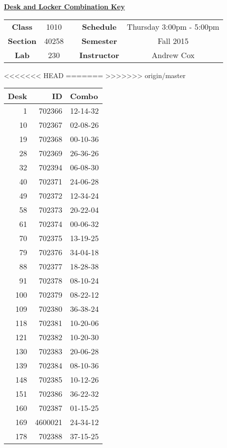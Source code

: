 \documentclass[12pt]{article}
\begin{document}
\thispagestyle{empty}

\begin{center}
	{\huge\textbf{\underline{ Desk and Locker Combination Key}}}
\end{center}


\begin{table}[h]
  \centering
  \begin{tabular}{ccccc}

  \textbf{Class} & 1010 & {\qquad} &\textbf{Schedule} & Thursday 3:00pm - 5:00pm \\
  \textbf{Section} & 40258 & {\qquad} & \textbf{Semester} & Fall 2015 \\
  \textbf{Lab} & 230 & {\qquad} & \textbf{Instructor} & Andrew Cox \\
  \end{tabular}
\end{table}
<<<<<<< HEAD
 \vspace{0.1in}
=======
 \vspace{0.5in}
>>>>>>> origin/master
\begin{minipage}{0.4\textwidth}

\begin{tabular}{rrl}
\toprule
 Desk &       ID &     Combo \\
\midrule
    1 &   702366 &  12-14-32 \\
   10 &   702367 &  02-08-26 \\
   19 &   702368 &  00-10-36 \\
   28 &   702369 &  26-36-26 \\
   32 &   702394 &  06-08-30 \\
   40 &   702371 &  24-06-28 \\
   49 &   702372 &  12-34-24 \\
   58 &   702373 &  20-22-04 \\
   61 &   702374 &  00-06-32 \\
   70 &   702375 &  13-19-25 \\
   79 &   702376 &  34-04-18 \\
   88 &   702377 &  18-28-38 \\
   91 &   702378 &  08-10-24 \\
  100 &   702379 &  08-22-12 \\
  109 &   702380 &  36-38-24 \\
  118 &   702381 &  10-20-06 \\
  121 &   702382 &  10-20-30 \\
  130 &   702383 &  20-06-28 \\
  139 &   702384 &  08-10-36 \\
  148 &   702385 &  10-12-26 \\
  151 &   702386 &  36-22-32 \\
  160 &   702387 &  01-15-25 \\
  169 &  4600021 &  24-34-12 \\
  178 &   702388 &  37-15-25 \\
\bottomrule
\end{tabular}


\end{minipage}
\end{document}
